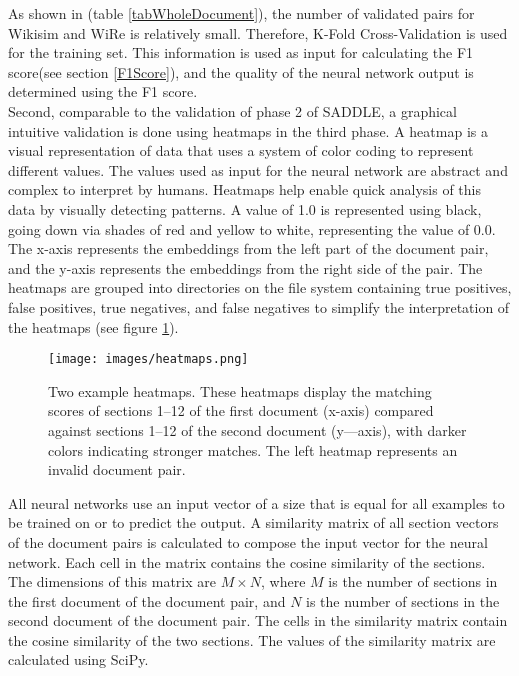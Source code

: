 As shown in (table \ref{tabWholeDocument}), the number of validated pairs for Wikisim and WiRe is relatively small. Therefore, K-Fold Cross-Validation is used for the training set. This information is used as input for calculating the F1 score(see section \ref{F1Score}), and the quality of the neural network output is determined using the F1 score.\\ 

Second, comparable to the validation of phase 2 of SADDLE, a graphical intuitive validation is done using heatmaps in the third phase. A heatmap is a visual representation of data that uses a system of color coding to represent different values. The values used as input for the neural network are abstract and complex to interpret by humans. Heatmaps help enable quick analysis of this data by visually detecting patterns. A value of 1.0 is represented using black, going down via shades of red and yellow to white, representing the value of 0.0. The x-axis represents the embeddings from the left part of the document pair, and the y-axis represents the embeddings from the right side of the pair. The heatmaps are grouped into directories on the file system containing true positives, false positives, true negatives, and false negatives to simplify the interpretation of the heatmaps (see figure \ref{imgHeatmaps}).\\

\begin{figure}[h]
\centering
\captionsetup{justification=centering}
\texttt{[image: images/heatmaps.png]}
\caption{Two example heatmaps. These heatmaps display the matching scores of sections 1–12 of the first document (x-axis) compared against sections 1–12 of the second document (y—axis), with darker colors indicating stronger matches. The left heatmap represents an invalid document pair.}
\label{imgHeatmaps}
\end{figure}


All neural networks use an input vector of a size that is equal for all examples to be trained on or to predict the output. A similarity matrix of all section vectors of the document pairs is calculated to compose the input vector for the neural network. Each cell in the matrix contains the cosine similarity of the sections. The dimensions of this matrix are $M \times N$, where $M$ is the number of sections in the first document of the document pair, and $N$ is the number of sections in the second document of the document pair. The cells in the similarity matrix contain the cosine similarity of the two sections. The values of the similarity matrix are calculated using SciPy. \\

